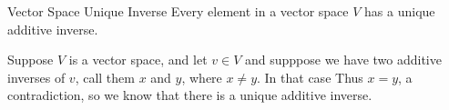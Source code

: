 \begin{proposition}{Vector Space Unique Inverse}
  Every element in a vector space $ V$ has a unique additive inverse.
  \begin{pf}
    Suppose $ V$ is a vector space, and let $  v \in V$ and supppose we have two additive inverses of $ v$, call them $ x$ and $ y$, where $ x \neq  y$. In that case
    Thus $ x =  y$, a contradiction, so we know that there is a unique additive inverse.
  \end{pf}
\end{proposition}
